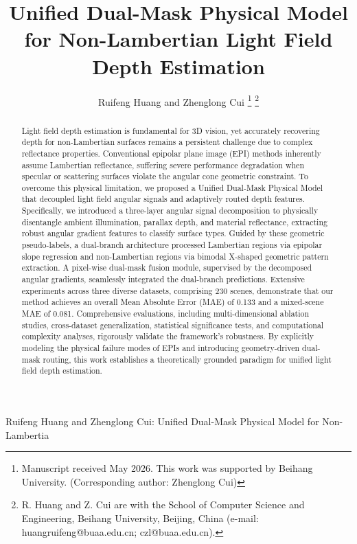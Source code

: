 \documentclass[lettersize,journal]{IEEEtran}
\begin{document}
\title{Unified Dual-Mask Physical Model for Non-Lambertian Light Field Depth Estimation}

\author{Ruifeng Huang and Zhenglong Cui
\thanks{Manuscript received May 2026. This work was supported by Beihang University. (Corresponding author: Zhenglong Cui)}
\thanks{R. Huang and Z. Cui are with the School of Computer Science and Engineering, Beihang University, Beijing, China (e-mail: huangruifeng@buaa.edu.cn; czl@buaa.edu.cn).}}

%
{Ruifeng Huang and Zhenglong Cui: Unified Dual-Mask Physical Model for Non-Lambertia}

\maketitle

\begin{abstract}
Light field depth estimation is fundamental for 3D vision, yet accurately recovering depth for non-Lambertian surfaces remains a persistent challenge due to complex reflectance properties. Conventional epipolar plane image (EPI) methods inherently assume Lambertian reflectance, suffering severe performance degradation when specular or scattering surfaces violate the angular cone geometric constraint. To overcome this physical limitation, we proposed a Unified Dual-Mask Physical Model that decoupled light field angular signals and adaptively routed depth features. Specifically, we introduced a three-layer angular signal decomposition to physically disentangle ambient illumination, parallax depth, and material reflectance, extracting robust angular gradient features to classify surface types. Guided by these geometric pseudo-labels, a dual-branch architecture processed Lambertian regions via epipolar slope regression and non-Lambertian regions via bimodal X-shaped geometric pattern extraction. A pixel-wise dual-mask fusion module, supervised by the decomposed angular gradients, seamlessly integrated the dual-branch predictions. Extensive experiments across three diverse datasets, comprising 230 scenes, demonstrate that our method achieves an overall Mean Absolute Error (MAE) of 0.133 and a mixed-scene MAE of 0.081. Comprehensive evaluations, including multi-dimensional ablation studies, cross-dataset generalization, statistical significance tests, and computational complexity analyses, rigorously validate the framework's robustness. By explicitly modeling the physical failure modes of EPIs and introducing geometry-driven dual-mask routing, this work establishes a theoretically grounded paradigm for unified light field depth estimation.
\end{abstract}
\end{document}
